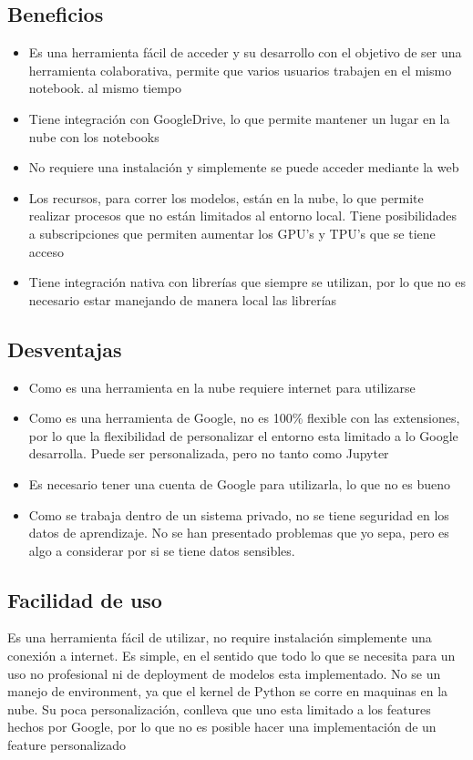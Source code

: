\documentclass[a4paper,12pt]{article}
\begin{document}
\subsection{Beneficios}
\begin{itemize}
    \item Es una herramienta fácil de acceder y su desarrollo con el objetivo
        de ser una herramienta colaborativa, permite que varios usuarios
        trabajen en el mismo notebook.\cite{google_colab_docs} al mismo tiempo
    \item Tiene integración con GoogleDrive, lo que permite mantener un lugar en
        la nube con los notebooks\cite{colab_faqs}
    \item No requiere una instalación y simplemente se puede acceder mediante la
        web
    \item Los recursos, para correr los modelos, están en la nube, lo que permite
        realizar procesos que no están limitados al entorno local. Tiene
        posibilidades a subscripciones que permiten aumentar los GPU's y TPU's
        que se tiene acceso
    \item Tiene integración nativa con librerías que siempre se utilizan, por lo
        que no es necesario estar manejando de manera local las librerías
\end{itemize}
\subsection{Desventajas}
\begin{itemize}
    \item Como es una herramienta en la nube requiere internet para utilizarse
    \item Como es una herramienta de Google, no es 100\% flexible con las
        extensiones, por lo que la flexibilidad de personalizar el entorno esta
        limitado a lo Google desarrolla. Puede ser personalizada, pero no tanto
        como Jupyter
    \item Es necesario tener una cuenta de Google para utilizarla, lo que no es
        bueno \cite{google_colab_docs}
    \item Como se trabaja dentro de un sistema privado, no se tiene seguridad en
        los datos de aprendizaje. No se han presentado problemas que yo sepa,
        pero es algo a considerar por si se tiene datos sensibles.
\end{itemize}
\subsection{Facilidad de uso}
Es una herramienta fácil de utilizar, no require instalación simplemente una
conexión a internet. Es simple, en el sentido que todo lo que se necesita para
un uso no profesional ni de deployment de modelos esta implementado. No se
un manejo de environment, ya que el kernel de Python se corre en maquinas en la
nube.
Su poca personalización, conlleva que uno esta limitado a los features hechos
por Google, por lo que no es posible hacer una implementación de un feature
personalizado
\end{document}
